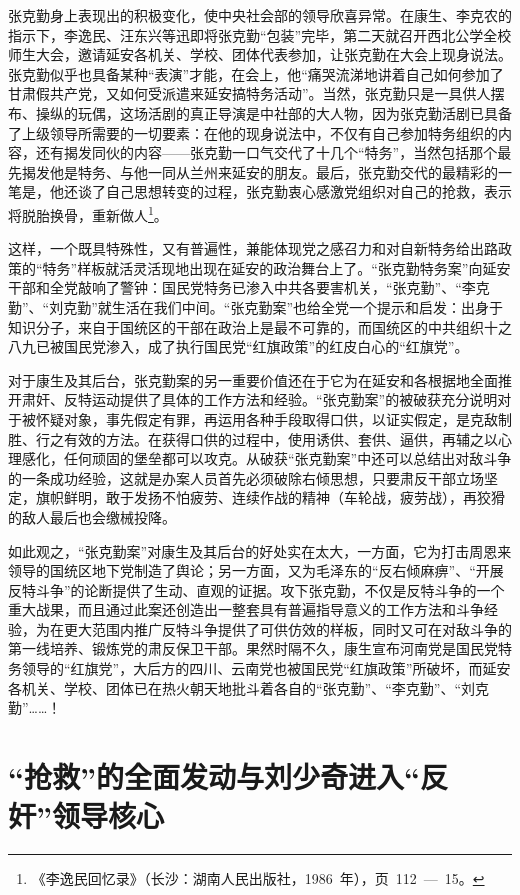 张克勤身上表现出的积极变化，使中央社会部的领导欣喜异常。在康生、李克农的指示下，李逸民、汪东兴等迅即将张克勤“包装”完毕，第二天就召开西北公学全校师生大会，邀请延安各机关、学校、团体代表参加，让张克勤在大会上现身说法。张克勤似乎也具备某种“表演”才能，在会上，他“痛哭流涕地讲着自己如何参加了甘肃假共产党，又如何受派遣来延安搞特务活动”。当然，张克勤只是一具供人摆布、操纵的玩偶，这场活剧的真正导演是中社部的大人物，因为张克勤活剧已具备了上级领导所需要的一切要素：在他的现身说法中，不仅有自己参加特务组织的内容，还有揭发同伙的内容——张克勤一口气交代了十几个“特务”，当然包括那个最先揭发他是特务、与他一同从兰州来延安的朋友。最后，张克勤交代的最精彩的一笔是，他还谈了自己思想转变的过程，张克勤衷心感激党组织对自己的抢救，表示将脱胎换骨，重新做人\footnote{《李逸民回忆录》（长沙：湖南人民出版社，1986~年），页~112~—~15。}。

这样，一个既具特殊性，又有普遍性，兼能体现党之感召力和对自新特务给出路政策的“特务”样板就活灵活现地出现在延安的政治舞台上了。“张克勤特务案”向延安干部和全党敲响了警钟：国民党特务已渗入中共各要害机关，“张克勤”、“李克勤”、“刘克勤”就生活在我们中间。“张克勤案”也给全党一个提示和启发：出身于知识分子，来自于国统区的干部在政治上是最不可靠的，而国统区的中共组织十之八九已被国民党渗入，成了执行国民党“红旗政策”的红皮白心的“红旗党”。

对于康生及其后台，张克勤案的另一重要价值还在于它为在延安和各根据地全面推开肃奸、反特运动提供了具体的工作方法和经验。“张克勤案”的被破获充分说明对于被怀疑对象，事先假定有罪，再运用各种手段取得口供，以证实假定，是克敌制胜、行之有效的方法。在获得口供的过程中，使用诱供、套供、逼供，再辅之以心理感化，任何顽固的堡垒都可以攻克。从破获“张克勤案”中还可以总结出对敌斗争的一条成功经验，这就是办案人员首先必须破除右倾思想，只要肃反干部立场坚定，旗帜鲜明，敢于发扬不怕疲劳、连续作战的精神（车轮战，疲劳战），再狡猾的敌人最后也会缴械投降。

如此观之，“张克勤案”对康生及其后台的好处实在太大，一方面，它为打击周恩来领导的国统区地下党制造了舆论；另一方面，又为毛泽东的“反右倾麻痹”、“开展反特斗争”的论断提供了生动、直观的证据。攻下张克勤，不仅是反特斗争的一个重大战果，而且通过此案还创造出一整套具有普遍指导意义的工作方法和斗争经验，为在更大范围内推广反特斗争提供了可供仿效的样板，同时又可在对敌斗争的第一线培养、锻炼党的肃反保卫干部。果然时隔不久，康生宣布河南党是国民党特务领导的“红旗党”，大后方的四川、云南党也被国民党“红旗政策”所破坏，而延安各机关、学校、团体已在热火朝天地批斗着各自的“张克勤”、“李克勤”、“刘克勤”……！

\section{“抢救”的全面发动与刘少奇进入“反奸”领导核心}

